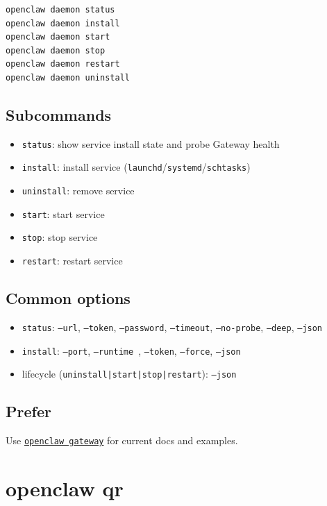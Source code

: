 \begin{lstlisting}[language=bash]
openclaw daemon status
openclaw daemon install
openclaw daemon start
openclaw daemon stop
openclaw daemon restart
openclaw daemon uninstall
\end{lstlisting}


\subsection{Subcommands}


\begin{itemize}
  \item \texttt{status}: show service install state and probe Gateway health
  \item \texttt{install}: install service (\texttt{launchd}/\texttt{systemd}/\texttt{schtasks})
  \item \texttt{uninstall}: remove service
  \item \texttt{start}: start service
  \item \texttt{stop}: stop service
  \item \texttt{restart}: restart service
\end{itemize}


\subsection{Common options}


\begin{itemize}
  \item \texttt{status}: \texttt{--url}, \texttt{--token}, \texttt{--password}, \texttt{--timeout}, \texttt{--no-probe}, \texttt{--deep}, \texttt{--json}
  \item \texttt{install}: \texttt{--port}, \texttt{--runtime }, \texttt{--token}, \texttt{--force}, \texttt{--json}
  \item lifecycle (\texttt{uninstall|start|stop|restart}): \texttt{--json}
\end{itemize}


\subsection{Prefer}


Use \href{/cli/gateway}{\texttt{openclaw gateway}} for current docs and examples.


\clearpage

\section{openclaw qr}


